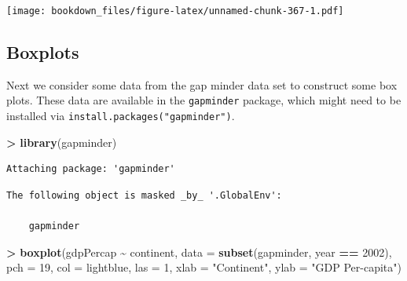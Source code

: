 \documentclass[
]{krantz}
\makeatletter
\newenvironment{Shaded}{\begin{snugshade}}{\end{snugshade}}
\newcommand{\DataTypeTok}[1]{\textcolor[rgb]{0.27,0.27,0.27}{#1}}
\newcommand{\DecValTok}[1]{\textcolor[rgb]{0.06,0.06,0.06}{#1}}
\newcommand{\KeywordTok}[1]{\textcolor[rgb]{0.27,0.27,0.27}{\textbf{#1}}}
\newcommand{\NormalTok}[1]{#1}
\newcommand{\OperatorTok}[1]{\textcolor[rgb]{0.43,0.43,0.43}{\textbf{#1}}}
\newcommand{\StringTok}[1]{\textcolor[rgb]{0.5,0.5,0.5}{#1}}
\newenvironment{kframe}{%
\medskip{}
\setlength{\fboxsep}{.8em}
 \def\at@end@of@kframe{}%
 \ifinner\ifhmode%
  \def\at@end@of@kframe{\end{minipage}}%
  \begin{minipage}{\columnwidth}%
 \fi\fi%
 \def\FrameCommand##1{\hskip\@totalleftmargin \hskip-\fboxsep
 \colorbox{shadecolor}{##1}\hskip-\fboxsep
     \hskip-\linewidth \hskip-\@totalleftmargin \hskip\columnwidth}%
 \MakeFramed {\advance\hsize-\width
   \@totalleftmargin\z@ \linewidth\hsize
   \@setminipage}}%
 {\par\unskip\endMakeFramed%
 \at@end@of@kframe}
\renewenvironment{Shaded}{\begin{kframe}}{\end{kframe}}
\makeatother
\begin{document}
\begin{Shaded}
\end{Shaded}

\texttt{[image: bookdown\_files/figure-latex/unnamed-chunk-367-1.pdf]}

\hypertarget{boxplots-1}{%
\subsection{Boxplots}\label{boxplots-1}}

Next we consider some data from the gap minder data set to construct some box plots. These data are available in the \texttt{gapminder} package, which might need to be installed via \texttt{install.packages("gapminder")}.

\begin{Shaded}
\begin{Highlighting}[]
\OperatorTok{\textgreater{}}\StringTok{ }\KeywordTok{library}\NormalTok{(gapminder)}
\end{Highlighting}
\end{Shaded}

\begin{verbatim}
Attaching package: 'gapminder'
\end{verbatim}

\begin{verbatim}
The following object is masked _by_ '.GlobalEnv':

    gapminder
\end{verbatim}

\begin{Shaded}
\begin{Highlighting}[]
\OperatorTok{\textgreater{}}\StringTok{ }\KeywordTok{boxplot}\NormalTok{(gdpPercap }\OperatorTok{\textasciitilde{}}\StringTok{ }\NormalTok{continent, }\DataTypeTok{data =} \KeywordTok{subset}\NormalTok{(gapminder, year }\OperatorTok{==}\StringTok{ }\DecValTok{2002}\NormalTok{), }\DataTypeTok{pch =} \DecValTok{19}\NormalTok{, }\DataTypeTok{col =} \StringTok{\textquotesingle{}lightblue\textquotesingle{}}\NormalTok{, }\DataTypeTok{las =} \DecValTok{1}\NormalTok{, }\DataTypeTok{xlab =} \StringTok{"Continent"}\NormalTok{, }\DataTypeTok{ylab =} \StringTok{"GDP Per{-}capita"}\NormalTok{)}
\end{Highlighting}
\end{Shaded}
\end{document}
